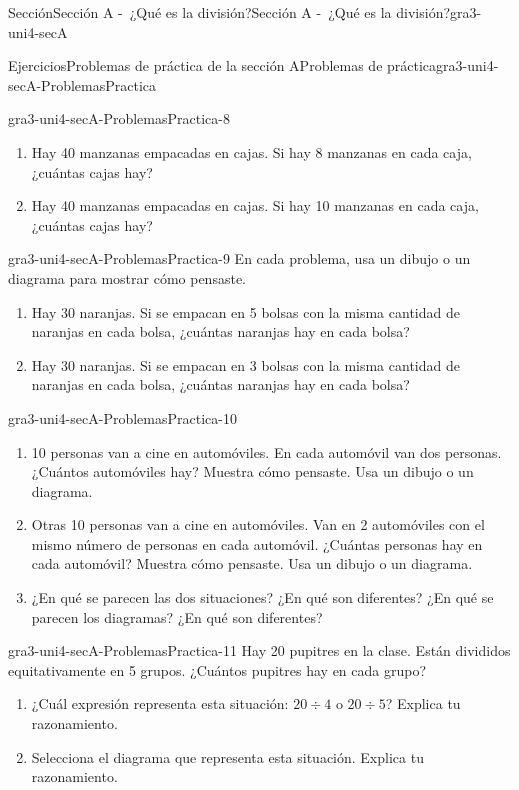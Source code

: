\documentclass[twoside,10pt,]{article}
\begin{document}
\begin{sectionptx}{Sección}{Sección A -~¿Qué es la división?}{}{Sección A -~¿Qué es la división?}{}{}{gra3-uni4-secA}
\begin{exercises-subsection}{Ejercicios}{Problemas de práctica de la sección A}{}{Problemas de práctica}{}{}{gra3-uni4-secA-ProblemasPractica}
\begin{divisionexercise}{6}{}{}{gra3-uni4-secA-ProblemasPractica-8}
\begin{enumerate}[label=(\alph*)]
\item{}Hay 40 manzanas empacadas en cajas. Si hay 8 manzanas en cada caja, ¿cuántas cajas hay?%
\item{}Hay 40 manzanas empacadas en cajas. Si hay 10 manzanas en cada caja, ¿cuántas cajas hay?%
\end{enumerate}
%
\end{divisionexercise}%
\begin{divisionexercise}{7}{}{}{gra3-uni4-secA-ProblemasPractica-9}%
En cada problema, usa un dibujo o un diagrama para mostrar cómo pensaste.%
%
\begin{enumerate}[label=(\alph*)]
\item{}Hay 30 naranjas. Si se empacan en 5 bolsas con la misma cantidad de naranjas en cada bolsa, ¿cuántas naranjas hay en cada bolsa?%
\item{}Hay 30 naranjas. Si se empacan en 3 bolsas con la misma cantidad de naranjas en cada bolsa, ¿cuántas naranjas hay en cada bolsa?%
\end{enumerate}
\end{divisionexercise}%
\begin{divisionexercise}{8}{}{}{gra3-uni4-secA-ProblemasPractica-10}%
%
\begin{enumerate}[label=(\alph*)]
\item{}10 personas van a cine en automóviles. En cada automóvil van dos personas. ¿Cuántos automóviles hay? Muestra cómo pensaste. Usa un dibujo o un diagrama.%
\item{}Otras 10 personas van a cine en automóviles. Van en 2 automóviles con el mismo número de personas en cada automóvil. ¿Cuántas personas hay en cada automóvil? Muestra cómo pensaste. Usa un dibujo o un diagrama.%
\item{}¿En qué se parecen las dos situaciones? ¿En qué son diferentes? ¿En qué se parecen los diagramas? ¿En qué son diferentes?%
\end{enumerate}
%
\end{divisionexercise}%
\begin{divisionexercise}{9}{}{}{gra3-uni4-secA-ProblemasPractica-11}%
Hay 20 pupitres en la clase. Están divididos equitativamente en 5 grupos. ¿Cuántos pupitres hay en cada grupo?%
\par
%
\begin{enumerate}[label=(\alph*)]
\item{}¿Cuál expresión representa esta situación: \(20\div 4\) o \(20\div 5\)? Explica tu razonamiento.%
\item{}Selecciona el diagrama que representa esta situación. Explica tu razonamiento.%

\end{enumerate}
\end{divisionexercise}
\end{exercises-subsection}
\end{sectionptx}
\end{document}
